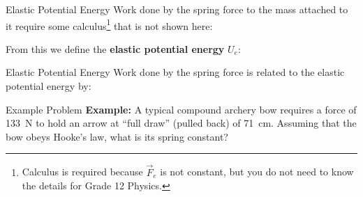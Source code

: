 \documentclass[12pt,compress,aspectratio=169]{beamer}
\begin{document}
\begin{frame}{Elastic Potential Energy}
  Work done by the spring force to the mass attached to it require some
  calculus\footnote{Calculus is required because $\vec F_e$ is not constant,
  but you do not need to know the details for Grade 12 Physics.} that is not
  shown here:

  
  From this we define the \textbf{elastic potential energy} $U_e$:

\end{frame}



\begin{frame}{Elastic Potential Energy}
  Work done by the spring force is related to the elastic potential energy by:
  

\end{frame}







\begin{frame}{Example Problem}
  \textbf{Example:} A typical compound archery bow requires a force of
  \SI{133}{\newton} to hold an arrow at ``full draw'' (pulled back) of
  \SI{71}{\centi\metre}. Assuming that the bow obeys Hooke's law, what is its
  spring constant?
\end{frame}
\end{document}
